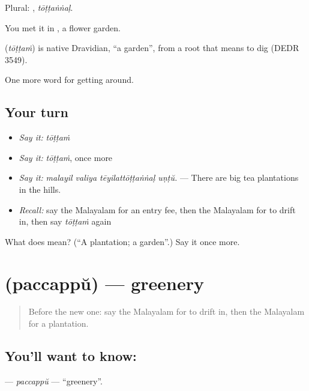 Plural: , \emph{tōṭṭaṅṅaḷ}.

You met it in , a flower garden.

\begin{cousinweb}
\textbf{} (\emph{tōṭṭaṁ}) is native Dravidian, \textquotedblleft{}a garden\textquotedblright{}, from a root that means to dig (DEDR 3549).
\end{cousinweb}

\begin{grammarlens}[title={What you've built}]
One more word for getting around.
\end{grammarlens}

\subsection*{Your turn}
\begin{itemize}
\raggedright
  \item \emph{Say it:} \emph{tōṭṭaṁ}
  \item \emph{Say it:} \emph{tōṭṭaṁ}, once more
  \item \emph{Say it:} \emph{malayil valiya tēyilattōṭṭaṅṅaḷ uṇṭŭ.} — There are big tea plantations in the hills.
  \item \emph{Recall:} say the Malayalam for an entry fee, then the Malayalam for to drift in, then say \emph{tōṭṭaṁ} again
\end{itemize}

\begin{tcolorbox}[breakable,colback=teal!4,colframe=teal!35!black,title={Before you move on}]
What does  mean? (\textquotedblleft{}A plantation; a garden\textquotedblright{}.) Say it once more.
\end{tcolorbox}
\section[\texorpdfstring{\ml{പച്ചപ്പ്} (paccappŭ)}{പച്ചപ്പ് (paccappŭ)}]{ (paccappŭ) — greenery}

\label{lesson:ML-C502-paccappu}



\begin{quote}
Before the new one: say the Malayalam for to drift in, then the Malayalam for a plantation.
\end{quote}

\subsection*{You'll want to know: }
\textbf{} — \emph{paccappŭ} — \textquotedblleft{}greenery\textquotedblright{}.

